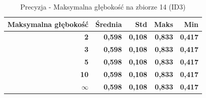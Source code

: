 \begin{table}[htbp]
\centering
\small
\setlength{\tabcolsep}{6pt}
\renewcommand{\arraystretch}{1.2}
\caption{Precyzja - Maksymalna głębokość na zbiorze 14 (ID3)}
\label{tab:ID3_max_depth_14_precision}
\begin{tabular}{r|r|r|r|r}
\toprule
Maksymalna głębokość & Średnia & Std & Maks & Min \\
\hline
\textbf{2} & \textbf{0,598} & \textbf{0,108} & \textbf{0,833} & \textbf{0,417} \\
\textbf{3} & \textbf{0,598} & \textbf{0,108} & \textbf{0,833} & \textbf{0,417} \\
\textbf{5} & \textbf{0,598} & \textbf{0,108} & \textbf{0,833} & \textbf{0,417} \\
\textbf{10} & \textbf{0,598} & \textbf{0,108} & \textbf{0,833} & \textbf{0,417} \\
\textbf{$\infty$} & \textbf{0,598} & \textbf{0,108} & \textbf{0,833} & \textbf{0,417} \\
\bottomrule
\end{tabular}
\end{table}
